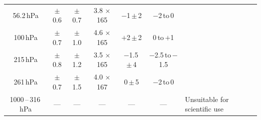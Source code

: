 \documentclass[11pt,draft]{report}
\newcommand{\currentnav}{BLANK}
\begin{document}
\begin{table}
\begin{minipage}{\textheight}
\begin{tabular}{ccccccl}
56.2\,hPa          & $\pm$0.6  & $\pm$0.7 & 3.8 $\times$ 165 & $-$1\,$\pm$\,2    & $-$2\,to\,0 & \\
100\,hPa           & $\pm$0.7  & $\pm$1.0 & 4.6 $\times$ 165 & $+$2\,$\pm$\,2    &  0\,to\,$+$1  & \\
215\,hPa           & $\pm$0.8  & $\pm$1.2   & 3.5 $\times$ 165 &  $-$1.5\,$\pm$\,4 & $-$2.5\,to\,$-$1.5   & \\
261\,hPa           & $\pm$0.7  & $\pm$1.5   & 4.0 $\times$ 167 &  0\,$\pm$\,5      & $-$2\,to\,0   & \\
1000\,--\,316\,hPa & ---       & ---      & ---              & ---           & --- & Unsuitable for scientific use\\
\bottomrule
\end{tabular}
\end{minipage}
\end{table}


 
\clearpage

 \clearpage
\renewcommand{\currentnav}{BLANK}
%
\renewcommand{\leftmark}{Bibliography}
\renewcommand{\rightmark}{Bibliography}

%
\end{document}
